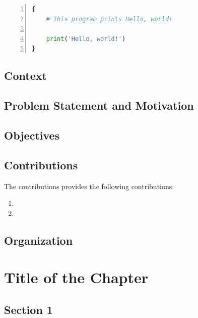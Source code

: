 \documentclass[11pt,a4paper]{report}
\begin{document}
\begin{lstlisting}[xleftmargin = 1cm, basicstyle=\small\tt,captionpos=b,caption=Script for a basic Hello World, label=lst2, frame=single, numbers=left, language=Python]
{
    # This program prints Hello, world!

    print('Hello, world!')
}
\end{lstlisting}


\lipsum[1]


\section{Context} 
\label{sec:context}
\lipsum[1] 

\lipsum[1] 

\section{Problem Statement and Motivation}
\label{sec:motivation}
\lipsum[1] 

\lipsum[1]

\section{Objectives}
\label{sec:obj}
\lipsum[1]

\section{Contributions}
\label{sec:cont}
The contributions provides the following contributions:
\begin{enumerate}
    \item \lipsum[1]
    \item \lipsum[1]
\end{enumerate}

\section{Organization}
\label{sec:org}
\lipsum[1] 

\chapter{Title of the Chapter}
\label{cap:name1}

\lipsum[1] 

\section{Section 1}
\label{sec:sec1}
\end{document}
